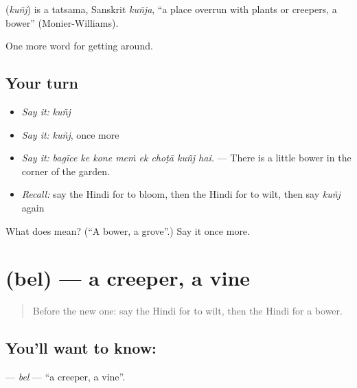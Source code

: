 \begin{cousinweb}
\textbf{} (\emph{kuñj}) is a tatsama, Sanskrit \emph{kuñja}, \textquotedblleft{}a place overrun with plants or creepers, a bower\textquotedblright{} (Monier-Williams).
\end{cousinweb}

\begin{grammarlens}[title={What you've built}]
One more word for getting around.
\end{grammarlens}

\subsection*{Your turn}
\begin{itemize}
\raggedright
  \item \emph{Say it:} \emph{kuñj}
  \item \emph{Say it:} \emph{kuñj}, once more
  \item \emph{Say it:} \emph{bagīce ke kone meṁ ek choṭā kuñj hai.} — There is a little bower in the corner of the garden.
  \item \emph{Recall:} say the Hindi for to bloom, then the Hindi for to wilt, then say \emph{kuñj} again
\end{itemize}

\begin{tcolorbox}[breakable,colback=teal!4,colframe=teal!35!black,title={Before you move on}]
What does  mean? (\textquotedblleft{}A bower, a grove\textquotedblright{}.) Say it once more.
\end{tcolorbox}
\section[\texorpdfstring{\hi{बेल} (bel)}{बेल (bel)}]{ (bel) — a creeper, a vine}

\label{lesson:HI-C447-bel}



\begin{quote}
Before the new one: say the Hindi for to wilt, then the Hindi for a bower.
\end{quote}

\subsection*{You'll want to know: }
\textbf{} — \emph{bel} — \textquotedblleft{}a creeper, a vine\textquotedblright{}.

